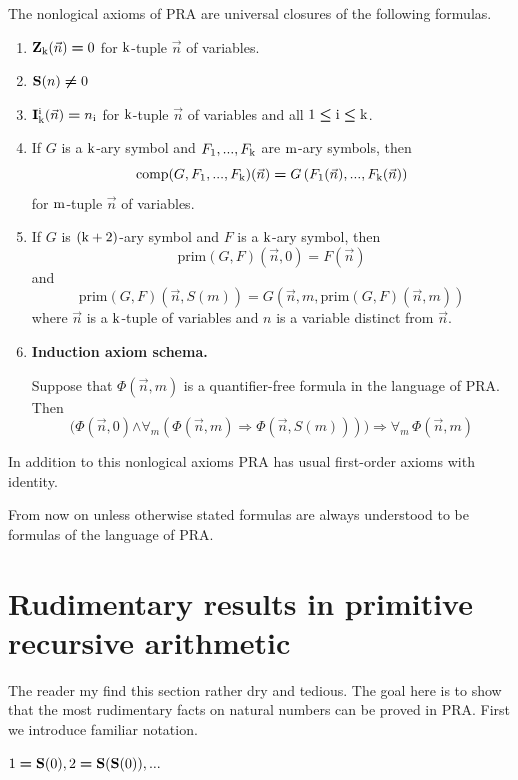 \documentclass[10pt]{amsart}
\newcommand{\mforall}{\boldsymbol{\forall}}
\newcommand{\mra}{\boldsymbol{\Rightarrow}}
\newcommand{\mand}{\boldsymbol{\wedge}}
\newcommand{\mleq}{\boldsymbol{\leq}}
\newcommand{\meq}{\boldsymbol{=}}
\newcommand{\mneq}{\boldsymbol{\neq}}
\begin{document}
The nonlogical axioms of $\mathrm{PRA}$ are universal closures of the following formulas.
\begin{enumerate}[label=\textbf{\arabic*.}, leftmargin=3.0em]
	\item $\bd{Z}_{\rm{k}}(\vec{n}) \meq 0$ for $\rm{k}$-tuple $\vec{n}$ of variables.
	\item $\bd{S}(n) \mneq 0$
  \item $\bd{I}^{\rm{i}}_{\rm{k}}(\vec{n}) \meq n_{\rm{i}}$ for $\rm{k}$-tuple $\vec{n}$ of variables and all $\rm{1} \mleq \rm{i} \mleq \rm{k}$.
  \item If $G$ is a $\rm{k}$-ary symbol and $F_{\rm{1}},...,F_{\rm{k}}$ are $\rm{m}$-ary symbols, then
    $$\mathrm{comp}(G,F_{\rm{1}},...,F_{\rm{k}})(\vec{n}) \meq G\left(F_{\rm{1}}(\vec{n}),...,F_{\rm{k}}(\vec{n})\right)$$
	      for $\rm{m}$-tuple $\vec{n}$ of variables.
      \item If $G$ is $\rm{(k+2)}$-ary symbol and $F$ is a $\rm{k}$-ary symbol, then
	      $$\mathrm{prim}(G,F)(\vec{n},0) \meq F(\vec{n})$$
	      and
	      $$\mathrm{prim}(G,F)\left(\vec{n},S(m)\right) \meq G\left(\vec{n},m,\mathrm{prim}(G,F)(\vec{n},m)\right)$$
	      where $\vec{n}$ is a $\rm{k}$-tuple of variables and $n$ is a variable distinct from $\vec{n}$.
	\item \textbf{Induction axiom schema.}

	      Suppose that $\Phi(\vec{n},m)$ is a quantifier-free formula in the language of $\mathrm{PRA}$. Then
	      $$\big(\Phi(\vec{n},0) \mand \mforall_m\left(\Phi(\vec{n},m) \mra \Phi(\vec{n},S(m))\right)\big) \mra \mforall_m\,\Phi(\vec{n},m)$$
\end{enumerate}
\noindent
In addition to this nonlogical axioms $\mathrm{PRA}$ has usual first-order axioms with identity.

From now on unless otherwise stated formulas are always understood to be formulas of the language of $\mathrm{PRA}$.

\section{Rudimentary results in primitive recursive arithmetic}
\noindent
The reader my find this section rather dry and tedious. The goal here is to show that the most rudimentary facts on natural numbers can be proved in $\mathrm{PRA}$. First we introduce familiar notation.

\begin{definition}
	$1 \meq \bd{S}(0),2 \meq \bd{S}(\bd{S}(0)),...$
\end{definition}
\end{document}
